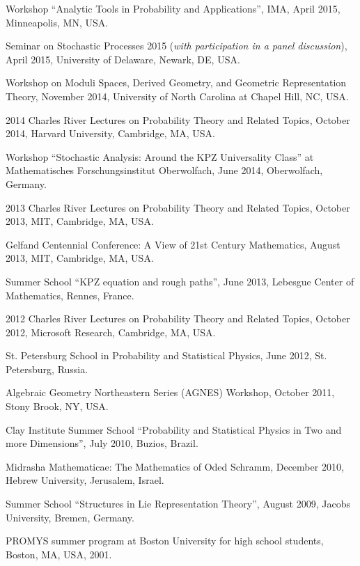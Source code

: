 \documentclass[letterpaper,11pt]{article}
\begin{document}
\begin{etaremune}
	\item
	      Workshop ``Analytic Tools in Probability and Applications'',
	      IMA, April 2015, Minneapolis, MN, USA.

	\item
	      Seminar on Stochastic Processes 2015 (\emph{with participation
		      in a panel discussion}), April 2015, University of Delaware, Newark, DE, USA.

	\item
	      Workshop on Moduli Spaces, Derived Geometry, and Geometric
	      Representation Theory, November 2014, University of North Carolina at Chapel
	      Hill, NC, USA.

	\item
	      2014 Charles River Lectures on Probability Theory and Related
	      Topics, October 2014, Harvard University, Cambridge, MA, USA.

	\item
	      Workshop ``Stochastic Analysis: Around the KPZ Universality
	      Class'' at Mathematisches Forschungsinstitut Oberwolfach, June 2014,
	      Oberwolfach, Germany.

	\item
	      2013 Charles River Lectures on Probability Theory and Related
	      Topics, October 2013, MIT, Cambridge, MA, USA.

	\item 
		Gelfand Centennial Conference:
		A View of 21st Century Mathematics, 
		August 2013, MIT, Cambridge, MA, USA.

	\item
	      Summer School ``KPZ equation and rough paths'', June 2013,
	      Lebesgue Center of Mathematics, Rennes, France.

	\item
	      2012 Charles River Lectures on Probability Theory and Related
	      Topics, October 2012, Microsoft Research, Cambridge, MA, USA.

	\item
	      St. Petersburg School in Probability and Statistical Physics,
	      June 2012, St. Petersburg, Russia.

	\item
	      Algebraic Geometry Northeastern Series (AGNES) Workshop, October
	      2011, Stony Brook, NY, USA.

	\item
	      Clay Institute Summer School ``Probability and Statistical
	      Physics in Two and more Dimensions'', July 2010, Buzios, Brazil.

	\item
	      Midrasha Mathematicae: The Mathematics of Oded Schramm, December
	      2010, Hebrew University, Jerusalem, Israel.

	\item
	      Summer School ``Structures in Lie Representation Theory'',
	      August 2009, Jacobs University, Bremen, Germany.

	\item
	      PROMYS summer program at Boston University for high school
	      students, Boston, MA, USA, 2001.
\end{etaremune}
\end{document}
